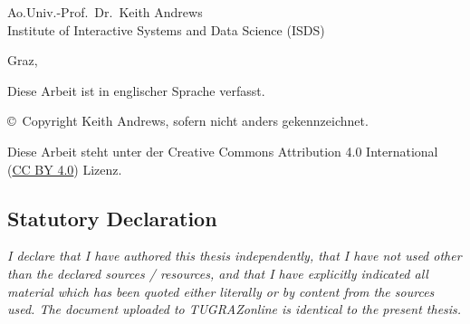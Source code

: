 \begin{otherlanguage}{austrian}
\begin{center}
{\normalsize\sffamily
Ao.Univ.-Prof.\ Dr.\ Keith Andrews \\
Institute of Interactive Systems and Data Science (ISDS)
}


\vspace{1cm}

{\normalsize\sffamily Graz, \thisdate}


\vspace{1cm}

{\small Diese Arbeit ist in englischer Sprache verfasst.}



\vfill

{\footnotesize\sffamily \copyright~Copyright \thisyear{} Keith Andrews, sofern
nicht anders gekennzeichnet.}

{\footnotesize\sffamily Diese Arbeit steht unter der Creative Commons
Attribution 4.0 International
(\href{https://creativecommons.org/licenses/by/4.0/}{CC BY 4.0})
Lizenz.}

\end{center}

\end{otherlanguage}







\cleardoublepage

\vspace*{2cm}







\subsection*{Statutory Declaration}
\noindent
\textit{
I declare that I have authored this thesis independently, that I have
not used other than the declared sources / resources, and that I have
explicitly indicated all material which has been quoted either
literally or by content from the sources used. The document uploaded
to TUGRAZonline is identical to the present thesis.}

